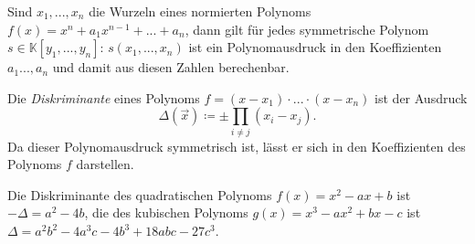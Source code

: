 \documentclass{cheat-sheet}
\newcommand{\K}{\mathbb{K}} %
\begin{document}
\begin{kor}
  Sind $x_1, ..., x_n$ die Wurzeln eines normierten Polynoms $f(x) = x^n + a_1 x^{n-1} + ... + a_n$, dann gilt für jedes symmetrische Polynom $s \in \K[y_1, ..., y_n]$: $s(x_1, ..., x_n)$ ist ein Polynomausdruck in den Koeffizienten $a_1 ..., a_n$ und damit aus diesen Zahlen berechenbar.
\end{kor}

\begin{defn}
  Die \emph{Diskriminante} eines Polynoms $f = (x - x_1) \cdot ... \cdot (x - x_n)$ ist der Ausdruck
  \[ \Delta (\vec{x}) \coloneqq \pm \prod_{i \not= j} (x_i - x_j). \]
  Da dieser Polynomausdruck symmetrisch ist, lässt er sich in den Koeffizienten des Polynoms $f$ darstellen.
\end{defn}

\begin{bsp}
  Die Diskriminante des quadratischen Polynoms $f(x) = x^2 - ax + b$ ist $- \Delta = a^2 - 4 b$, die des kubischen Polynoms $g(x) = x^3 - a x^2 + b x - c$ ist $\Delta = a^2 b^2 - 4 a^3 c - 4 b^3 + 18 abc - 27 c^3$.
\end{bsp}

\end{document}
